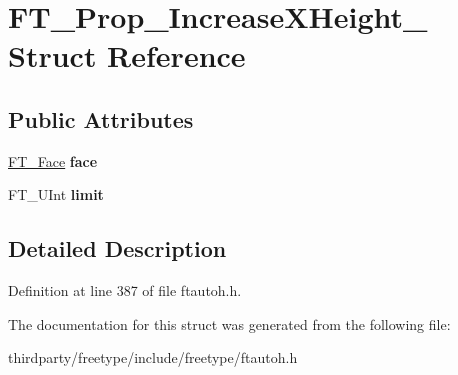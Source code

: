 \hypertarget{struct_f_t___prop___increase_x_height__}{}\section{F\+T\+\_\+\+Prop\+\_\+\+Increase\+X\+Height\+\_\+ Struct Reference}
\label{struct_f_t___prop___increase_x_height__}
\subsection*{Public Attributes}
\begin{DoxyCompactItemize}
\item 
\mbox{\label{struct_f_t___prop___increase_x_height___ae761b2b7e3e086b3d672f16f5cc48643}} 
\hyperlink{struct_f_t___face_rec__}{F\+T\+\_\+\+Face} {\bfseries face}
\item 
\mbox{\label{struct_f_t___prop___increase_x_height___ae276b4241881f9e8ea57fd3a9e9c0d8a}} 
F\+T\+\_\+\+U\+Int {\bfseries limit}
\end{DoxyCompactItemize}


\subsection{Detailed Description}


Definition at line 387 of file ftautoh.\+h.



The documentation for this struct was generated from the following file\+:\begin{DoxyCompactItemize}
\item 
thirdparty/freetype/include/freetype/ftautoh.\+h\end{DoxyCompactItemize}
